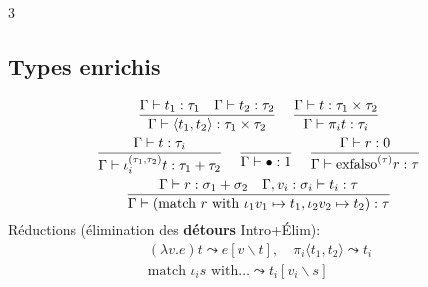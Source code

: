 \documentclass[12pt, a4paper]{article}
\newcommand{\inj}[1]{\iota_{#1}}
\newcommand{\vd}{\vdash}
\newcommand{\rul}[3]{\dfrac{#1}{#2}\,{\scriptstyle #3}}
\begin{document}
\begin{multicols*}{3}
	\subsection{Types enrichis}
	\begin{gather*}
		\rul{\Gamma\vd t_1:\tau_1\quad\Gamma\vd t_2:\tau_2}{\Gamma\vd\langle t_1,t_2\rangle:\tau_1\times\tau_2}{}\quad
		\rul{\Gamma\vd t:\tau_1\times\tau_2}{\Gamma\vd\pi_it:\tau_i}{}\\
		\rul{\Gamma\vd t:\tau_i}{\Gamma\vd\inj i^{(\tau_1,\tau_2)}t:\tau_1+\tau_2}{}\quad
		\rul{}{\Gamma\vd\bullet:1}{}\quad
		\rul{\Gamma\vd r:0}{\Gamma\vd\text{exfalso}^{(\tau)}r:\tau}{}\\
		\rul{\Gamma\vd r:\sigma_1+\sigma_2\quad\Gamma,v_i:\sigma_i\vd t_i:\tau}{\Gamma\vd(\text{match }r\text{ with }\inj1v_1\mapsto t_1,\inj2v_2\mapsto t_2):\tau}{}
	\end{gather*}
	Réductions (élimination des \textbf{détours} Intro+Élim):
	\begin{gather*}
		(\lambda v.e)t\leadsto e[v\backslash t],\quad\pi_i\langle t_1,t_2\rangle\leadsto t_i\\
		\text{match }\inj is\text{ with}\dots\leadsto t_i[v_i\backslash s]
	\end{gather*}


\end{multicols*}
\end{document}
